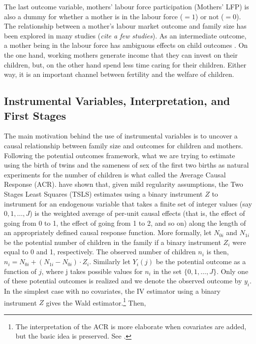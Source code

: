 The last outcome variable, mothers' labour force participation (Mothers' LFP) is also a dummy for whether a mother is in the labour force ($ =1 $) or not ($ =0 $). The relationship between a mother's labour market outcome and family size has been explored in many studies (\textit{cite a few studies}). As an intermediate outcome, a mother being in the labour force has ambiguous effects on child outcomes \parencite{caceres-delpiano_impacts_2006}. On the one hand, working mothers generate income that they can invest on their children, but, on the other hand spend less time caring for their children. Either way, it is an important channel between fertility and the welfare of children. 


\subsection*{Instrumental Variables, Interpretation, and First Stages}

The main motivation behind the use of instrumental variables is to uncover a causal relationship between family size and outcomes for children and mothers. Following the potential outcomes framework, what we are trying to estimate using the birth of twins and the sameness of sex of the first two births as natural experiments for the number of children is what \textcite{Angrist1995} called the Average Causal Response (ACR). \textcite{Angrist1995} have shown that, given mild regularity assumptions, the Two Stages Least Squares (TSLS) estimates using a binary instrument $ Z $ to instrument for an endogenous variable that takes a finite set of integer values  (say $ 0, 1, \dots, J $) is the weighted average of per-unit causal effects (that is, the effect of going from 0 to 1, the effect of going from 1 to 2, and so on) along the length of an appropriately defined causal response function. More formally, let $ N_{0i} $ and $ N_{1i} $ be the potential number of children in the family if a binary instrument $ Z_{i} $ were equal to 0 and 1, respectively. The observed number of children $ n_{i} $ is then, $ n_{i} = N_{0i} + (N_{1i} - N_{0i})\cdot Z_{i} $. Similarly let $ Y_{i}(j) $ be the potential outcome as a function of $ j $, where j takes possible values for $ n_{i} $ in the set $ \{0, 1, \dots, J\} $. Only one of these potential outcomes is realized and we denote the observed outcome by $ y_{i} $. In the simplest case with no covariates, the IV estimator using a binary instrument $ Z $ gives the Wald estimator.\footnote{The interpretation of the ACR is more elaborate when covariates are added, but the basic idea is preserved. See \textcite[p.~437]{Angrist1995}.} Then,


